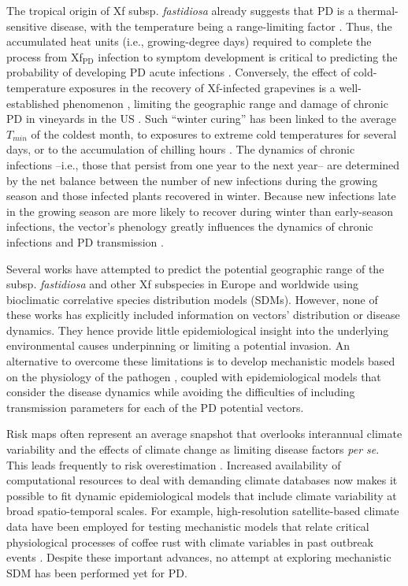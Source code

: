 The tropical origin of Xf subsp. \textit{fastidiosa} already suggests that PD
is a thermal-sensitive disease, with the temperature being a range-limiting
factor \cite{Castillo2021, Purcell2013}. Thus, the accumulated heat units
(i.e., growing-degree days) required to complete the process from
Xf$_{\textrm{PD}}$ infection to symptom development is critical to predicting
the probability of developing PD acute infections \cite{Feil2001}. Conversely,
the effect of cold-temperature exposures in the recovery of Xf-infected
grapevines is a well-established phenomenon \cite{Feil2001, Lieth2011,
    Purcell1980}, limiting the geographic range and damage of chronic PD in
vineyards in the US \cite{Hopkins2002}. Such ``winter curing'' has been linked
to the average $T_{min}$ of the coldest month, to exposures to extreme cold
temperatures for several days, or to the accumulation of chilling hours
\cite{Anas2008}. The dynamics of chronic infections --i.e., those that persist
from one year to the next year-- are determined by the net balance between the
number of new infections during the growing season and those infected plants
recovered in winter. Because new infections late in the growing season are more
likely to recover during winter than early-season infections, the vector's
phenology greatly influences the dynamics of chronic infections and PD
transmission  \cite{Feil2003,Redak2004,Gruber2012,Daugherty2019}.

Several works have attempted to predict the potential geographic range of the
subsp. \textit{fastidiosa} \cite{Bragard2019, Godefroid2019,Hoddle2004} and
other Xf subspecies in Europe \cite{Bosso2016, Schneider2020} and worldwide
\cite{Hoddle2004} using bioclimatic correlative species distribution models
(SDMs). However, none of these works has explicitly included information on
vectors' distribution or disease dynamics. They hence provide little
epidemiological insight into the underlying environmental causes underpinning
or limiting a potential invasion. An alternative to overcome these limitations
is to develop mechanistic models based on the physiology of the pathogen
\cite{Kearney2009}, coupled with epidemiological models that consider the
disease dynamics while avoiding the difficulties of including transmission
parameters for each of the PD potential vectors.

Risk maps often represent an average snapshot that overlooks interannual
climate variability and the effects of climate change as limiting disease
factors \textit{per se}. This leads frequently to risk overestimation
\cite{Bebber2013,Coakley1999,Scherm1994,Truscott2003}. Increased availability
of computational resources to deal with demanding climate databases now makes
it possible to fit dynamic epidemiological models that include climate
variability at broad spatio-temporal scales. For example, high-resolution
satellite-based climate data have been employed for testing mechanistic models
that relate critical physiological processes of coffee rust with climate
variables in past outbreak events \cite{Bebber2016}. Despite these important
advances, no attempt at exploring mechanistic SDM has been performed yet for
PD.

